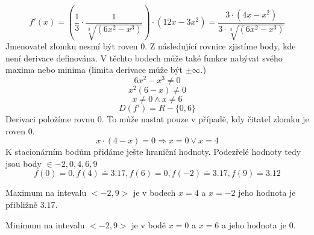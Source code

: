 \begin{displaymath}
f'(x)=\left(\frac{1}{3}\cdot\frac{1}{\sqrt[3]{(6x^2-x^3)}}\right)\cdot(12x-3x^2)=\frac{3\cdot(4x-x^2)}{3\cdot\sqrt[3]{(6x^2-x^3)}}
\end{displaymath}
Jmenovatel zlomku nesmí být roven 0. Z následující rovnice zjistíme body, kde není derivace definována. V těchto bodech může také funkce nabývat svého maxima nebo minima (limita derivace může být $\pm \infty$.)
\begin{displaymath}
6x^2-x^3\neq0
\end{displaymath}
\begin{displaymath}
x^2(6-x)\neq0
\end{displaymath}
\begin{displaymath}
x\neq0 \wedge  x\neq6
\end{displaymath}
\begin{displaymath}
D(f')=R-\{0,6\}
\end{displaymath}
Derivaci položíme rovnu 0. To může nastat pouze v případě, kdy čitatel zlomku je roven 0.
\begin{displaymath}
x\cdot(4-x) = 0 \Rightarrow x = 0 \vee x = 4
\end{displaymath}
K stacionárním bodům přidáme ješte hraniční hodnoty. 
Podezřelé hodnoty tedy jsou body $ \in{-2,0,4,6,9} $
\begin{displaymath}
f(0) = 0, f(4) \doteq 3.17, f(6) = 0, f(-2) \doteq 3.17, f(9) \doteq 3.12
\end{displaymath}

Maximum na intevalu $ <-2,9>$ je v bodech $x=4$ a $x=-2$ jeho hodnota je přibližně $3.17$.

Minimum na intevalu $ <-2,9>$ je v bodě $x=0$ a $x=6$ a jeho hodnota je $0$.
